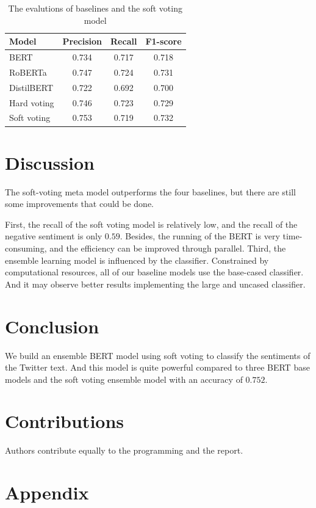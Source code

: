 \documentclass[runningheads]{llncs}
\begin{document}
\begin{table}[ht!]
	\centering
	\caption{The evalutions of baselines and the soft voting model}
	\label{tab:results}
	\begin{tabular}{lccc}
		\toprule
		\textbf{Model}       & \textbf{Precision} & \textbf{Recall} & \textbf{F1-score} \\ 
		\midrule
		BERT        & 0.734     & 0.717  & 0.718    \\
		RoBERTa     & 0.747     & 0.724  & 0.731    \\
		DistilBERT  & 0.722     & 0.692  & 0.700    \\
		Hard voting & 0.746     & 0.723  & 0.729    \\
		Soft voting & 0.753     & 0.719  & 0.732    \\ 
		\bottomrule
	\end{tabular}
\end{table}


\section{Discussion}
The soft-voting meta model outperforms the four baselines, but there are still some improvements that could be done. 

First, the recall of the soft voting model is relatively low, and the recall of the negative sentiment is only $0.59$. Besides, the running of the BERT is very time-consuming, and the efficiency can be improved through parallel. Third, the ensemble learning model is influenced by the classifier. Constrained by computational resources, all of our baseline models use the base-cased classifier. And it may observe better results implementing the large and uncased classifier.


\section{Conclusion}
We build an ensemble BERT model using soft voting to classify the sentiments of the Twitter text. And this model is quite powerful compared to three BERT base models and the soft voting ensemble model with an accuracy of $0.752$.
 
 
\section{Contributions}
Authors contribute equally to the programming and the report.

%
%


%

\section*{Appendix}
\end{document}
